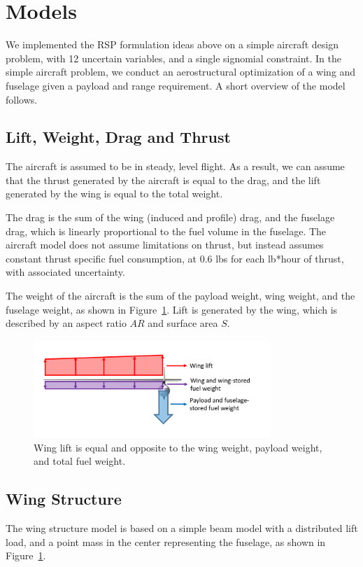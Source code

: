 \section{Models}

We implemented the RSP formulation ideas above on a simple aircraft design problem, with 12 uncertain variables,
and a single signomial constraint. In the simple aircraft problem, we conduct an aerostructural
optimization of a wing and fuselage given a payload and range requirement. A short overview of the model follows.

\subsection{Lift, Weight, Drag and Thrust}

The aircraft is assumed to be in steady, level flight. As a result,
we can assume that the thrust generated by the aircraft is equal to the drag,
and the lift generated by the wing is equal to the total weight.

The drag is the sum of the wing (induced and profile) drag, and the fuselage drag,
which is linearly proportional to the fuel volume in the fuselage.
The aircraft model does not assume limitations on thrust, but instead assumes constant thrust specific fuel consumption,
at 0.6 lbs for each lb*hour of thrust, with associated uncertainty.

The weight of the aircraft is the sum of the payload weight, wing weight, and
the fuselage weight, as shown in Figure~\ref{fig:liftweight}. Lift is generated by the wing,
which is described by an aspect ratio $AR$ and surface area $S$.

\begin{figure}
\centering
\caption{\label{fig:liftweight} Wing lift is equal and opposite to the wing weight, payload weight, and total fuel weight.}
\includegraphics[width=0.8\textwidth]{liftweight.PNG}
\end{figure}

\subsection{Wing Structure}
The wing structure model is based on a simple beam model with a distributed lift load,
and a point mass in the center representing the fuselage, as shown in Figure~\ref{fig:liftweight}.

